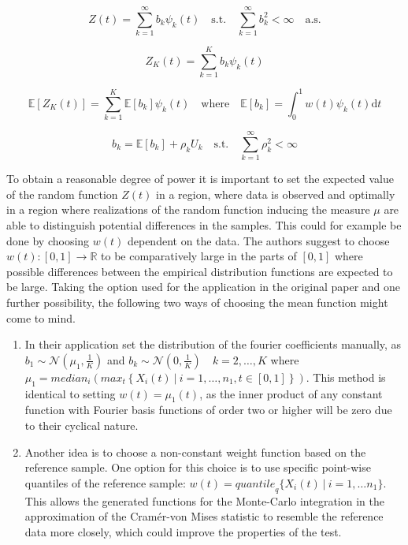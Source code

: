 \documentclass[12pt, a4paper]{article}
\theoremstyle{MAstyle} \newtheorem{assumption}{Assumption}[section]
\theoremstyle{MAstyle} \newtheorem{definition}{Definition}[section]
\theoremstyle{MAstyle} \newtheorem{theorem}{Theorem}[section]
\begin{document}
			\begin{equation}\label{non_truncated}
				Z(t) = \sum_{k = 1}^{\infty} b_k \psi_k(t)
				\quad \text{s.t.} \quad
				\sum_{k = 1}^{\infty} b_k^2 < \infty \quad \text{a.s.}
			\end{equation}

			\begin{equation}\label{truncation}
				Z_K(t) = \sum_{k = 1}^{K} b_k \psi_k(t)
			\end{equation}
		
			\begin{equation}
				\mathbb{E}\left[Z_K(t)\right] = \sum_{k = 1}^{K} \mathbb{E}\left[b_k\right] \psi_k(t)
				\quad \text{where} \quad
				\mathbb{E}\left[b_k\right] = \int_{0}^{1}w(t)\psi_k(t) \mathrm{d}t
			\end{equation}
		
			\begin{equation}\label{Fourier_coefs}
				b_k = \mathbb{E}\left[b_k\right] + \rho_k U_k
				\quad \text{s.t.} \quad
				\sum_{k = 1}^{\infty} \rho_k^2 < \infty 
			\end{equation}

			To obtain a reasonable degree of power it is important to set the expected value of the random function $Z(t)$ in a region, where data is observed and optimally in a region where realizations of the random function inducing the measure $\mu$ are able to distinguish potential differences in the samples. This could for example be done by choosing $w(t)$ dependent on the data. 	The authors suggest to choose $w(t):[0,1] \rightarrow \mathbb{R}$ to be comparatively large in the parts of $[0,1]$ where possible differences between the empirical distribution functions are expected to be large.
			Taking the option used for the application in the original paper and one further possibility, the following two ways of choosing the mean function might come to mind.
			
			\begin{enumerate}
				\item In their application \cite{bugni_permutation_2021} set the distribution of the fourier coefficients manually, as $b_1 \sim \mathcal{N}(\mu_1, \frac{1}{K})$ and $b_k \sim \mathcal{N}(0, \frac{1}{K}) \quad k = 2, \dots, K$ where $\mu_1 = \textit{median}_i \left(\textit{max}_t\left\{X_i(t) \ | \ i = 1, \dots, n_1, t\in [0,1]\right\}\right)$.
				This method is identical to setting $w(t) = \mu_1(t)$, as the inner product of any constant function with Fourier basis functions of order two or higher will be zero due to their cyclical nature.
				\item Another idea is to choose a non-constant weight function based on the reference sample. One option for this choice is to use specific point-wise quantiles of the reference sample: $w(t) = \textit{quantile}_q \{X_i(t) \ | \ i = 1, \dots n_1\}$. This allows the generated functions for the Monte-Carlo integration in the approximation of the Cram\'{e}r-von Mises statistic to resemble the reference data more closely, which could improve the properties of the test.
			\end{enumerate}
		
\end{document}
